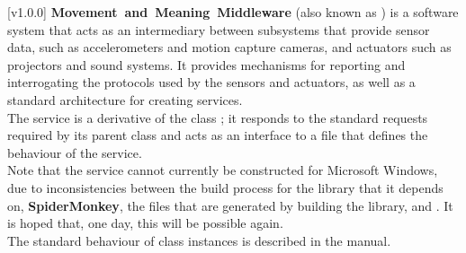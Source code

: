 [v1.0.0]
\textbf{Movement~and~Meaning~Middleware} (also known as \mplusm{}) is a software system
that acts as an intermediary between subsystems that provide sensor data, such as
accelerometers and motion capture cameras, and actuators such as projectors and sound
systems.
It provides mechanisms for reporting and interrogating the protocols used by the sensors
and actuators, as well as a standard architecture for creating services.\\

The \JSIO{} service is a derivative of the \mplusm{} class
;
it responds to the standard requests required by its parent class and acts as an interface
to a \JS{} file that defines the behaviour of the service.\\

Note that the \JSIO{} service cannot currently be constructed for Microsoft Windows, due
to inconsistencies between the build process for the library that it depends on,
\textbf{SpiderMonkey}, the files that are generated by building the library, and
.
It is hoped that, one day, this will be possible again.\\

The standard behaviour of  class instances is described
in the \emph{\MMM} manual.
\primaryEnd{}
